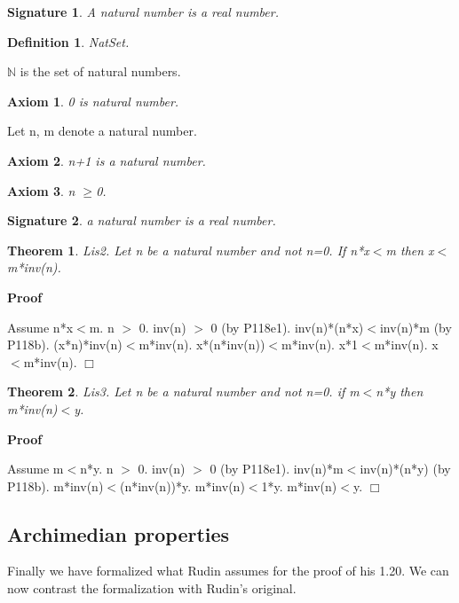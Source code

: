 \documentclass{article}
\newenvironment{forthel}{\begin{leftbar}}{\end{leftbar}}
\newenvironment{proof}{\noindent\textbf{Proof\ }}{\hspace*{\fill}$\Box$\medskip}
\newtheorem{axiom}{Axiom}
\newtheorem{theorem}{Theorem}
\newtheorem{definition}{Definition}
\newtheorem{signature}{Signature}
\begin{document}
\begin{forthel}
	\begin{signature} A natural number is a real number.

\end{signature}
	
	\begin{definition} NatSet.

\end{definition}
	$\mathbb{N}$ is the set of natural numbers.
	
	\begin{axiom} 0 is natural number.

\end{axiom}
	Let n, m denote a natural number.
	\begin{axiom} n+1 is a natural number.

\end{axiom}
	\begin{axiom} n $\geq$0.

\end{axiom}
	
	\begin{signature} a natural number is a real number.

\end{signature}
	
	

	
	\begin{theorem}
 Lis2. Let n be a natural number and not n=0. If n*x$<$m then x$<$m*inv(n).
\end{theorem}	\begin{proof}

	Assume n*x$<$m.
	n $>$ 0.
	inv(n) $>$ 0 (by P118e1).
	inv(n)*(n*x)$<$inv(n)*m (by P118b).
	(x*n)*inv(n)$<$m*inv(n).
	x*(n*inv(n))$<$m*inv(n).
	x*1$<$m*inv(n).
	x$<$m*inv(n).
	\end{proof}

	\begin{theorem}
 Lis3. Let n be a natural number and not n=0. if m$<$n*y then m*inv(n)$<$y.
\end{theorem}	\begin{proof}

	Assume m$<$n*y.
	n $>$ 0.
	inv(n) $>$ 0 (by P118e1).
	inv(n)*m$<$inv(n)*(n*y) (by P118b).
	m*inv(n)$<$(n*inv(n))*y.
	m*inv(n)$<$1*y.
	m*inv(n)$<$y.
	\end{proof}

\end{forthel}

\subsection{Archimedian properties}
Finally we have formalized what Rudin assumes for the proof of his 1.20. We can now contrast the formalization with Rudin's original.
\end{document}
